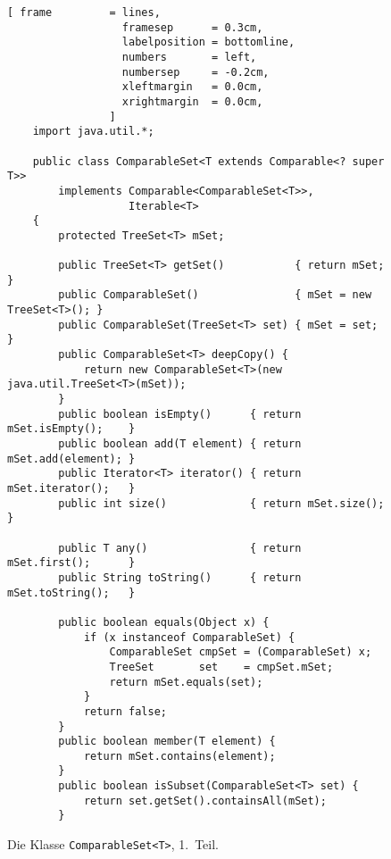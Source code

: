 \begin{figure}[!h]
\centering
\begin{Verbatim}[ frame         = lines, 
                  framesep      = 0.3cm, 
                  labelposition = bottomline,
                  numbers       = left,
                  numbersep     = -0.2cm,
                  xleftmargin   = 0.0cm,
                  xrightmargin  = 0.0cm,
                ]
    import java.util.*;
    
    public class ComparableSet<T extends Comparable<? super T>> 
        implements Comparable<ComparableSet<T>>, 
                   Iterable<T>
    {
        protected TreeSet<T> mSet;
    
        public TreeSet<T> getSet()           { return mSet;             }        
        public ComparableSet()               { mSet = new TreeSet<T>(); }
        public ComparableSet(TreeSet<T> set) { mSet = set;              } 
        public ComparableSet<T> deepCopy() {
            return new ComparableSet<T>(new java.util.TreeSet<T>(mSet));
        }
        public boolean isEmpty()      { return mSet.isEmpty();    }
        public boolean add(T element) { return mSet.add(element); }
        public Iterator<T> iterator() { return mSet.iterator();   }
        public int size()             { return mSet.size();       }

        public T any()                { return mSet.first();      }
        public String toString()      { return mSet.toString();   }
        
        public boolean equals(Object x) {
            if (x instanceof ComparableSet) {
                ComparableSet cmpSet = (ComparableSet) x;
                TreeSet       set    = cmpSet.mSet;
                return mSet.equals(set);
            }
            return false;
        }
        public boolean member(T element) {
            return mSet.contains(element);
        }
        public boolean isSubset(ComparableSet<T> set) {
            return set.getSet().containsAll(mSet);
        }
    \end{Verbatim}
\vspace*{-0.3cm}
\caption{Die Klasse \texttt{ComparableSet<T>}, 1.~Teil.}
\label{fig:ComparableSet-1}
\end{figure}

